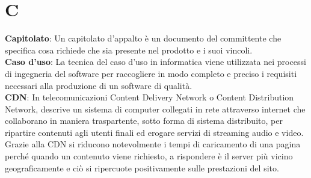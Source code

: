 \section*{C}
\textbf{Capitolato}: Un capitolato d’appalto è un documento del committente che specifica cosa richiede che
sia presente nel prodotto e i suoi vincoli.\\
\textbf{Caso d'uso}: La tecnica del caso d'uso in informatica viene utilizzata nei processi di ingegneria del software per raccogliere in modo completo e preciso i requisiti necessari alla produzione di un software di qualità.\\
\textbf{CDN}: In telecomunicazioni Content Delivery Network o Content Distribution Network, descrive un sistema di computer collegati in rete attraverso internet che collaborano in maniera traspartente, sotto forma di sistema distribuito, per ripartire contenuti  agli utenti finali ed erogare servizi di streaming audio e video. Grazie alla CDN si riducono notevolmente i tempi di caricamento di una pagina perché quando un contenuto viene richiesto, a rispondere è il server più vicino geograficamente e ciò si ripercuote positivamente sulle prestazioni del sito.\\  
